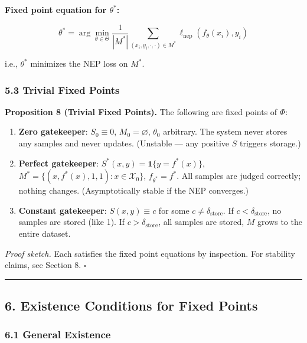 \documentclass[
  12pt,
]{article}
\begin{document}
\textbf{Fixed point equation for \(\theta^*\):}

\[\theta^* = \arg\min_{\theta \in \Theta} \frac{1}{|M^*|} \sum_{(x_i, y_i, \cdot, \cdot) \in M^*} \ell_{\text{nep}}(f_\theta(x_i), y_i)\]

i.e., \(\theta^*\) minimizes the NEP loss on \(M^*\).

\subsubsection{5.3 Trivial Fixed Points}\label{trivial-fixed-points}

\textbf{Proposition 8 (Trivial Fixed Points).} The following are fixed
points of \(\Phi\):

\begin{enumerate}
\def\labelenumi{\arabic{enumi}.}
\item
  \textbf{Zero gatekeeper}: \(S_0 \equiv 0\), \(M_0 = \varnothing\),
  \(\theta_0\) arbitrary. The system never stores any samples and never
  updates. (Unstable --- any positive \(S\) triggers storage.)
\item
  \textbf{Perfect gatekeeper}: \(S^*(x, y) = \mathbf{1}\{y = f^*(x)\}\),
  \(M^* = \{(x, f^*(x), 1, 1) : x \in \mathcal{X}_0\}\),
  \(f_{\theta^*} = f^*\). All samples are judged correctly; nothing
  changes. (Asymptotically stable if the NEP converges.)
\item
  \textbf{Constant gatekeeper}: \(S(x, y) \equiv c\) for some
  \(c \neq \delta_{\text{store}}\). If \(c < \delta_{\text{store}}\), no
  samples are stored (like 1). If \(c > \delta_{\text{store}}\), all
  samples are stored, \(M\) grows to the entire dataset.
\end{enumerate}

\emph{Proof sketch.} Each satisfies the fixed point equations by
inspection. For stability claims, see Section 8. \(\square\)

\begin{center}\rule{0.5\linewidth}{0.5pt}\end{center}

\subsection{6. Existence Conditions for Fixed
Points}\label{existence-conditions-for-fixed-points}

\subsubsection{6.1 General Existence}\label{general-existence}
\end{document}
